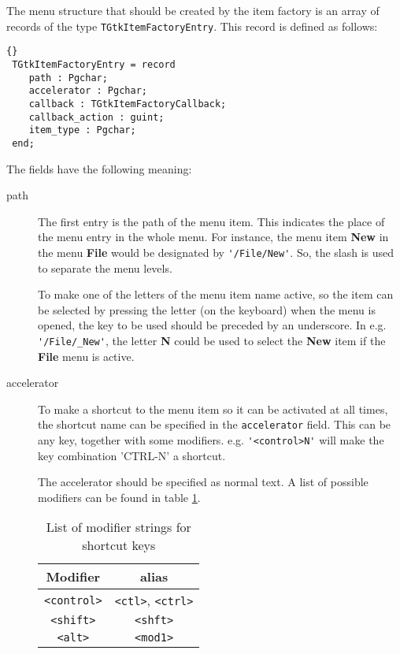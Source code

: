 \documentclass[10pt]{article}
\begin{document}
The menu structure that should be created by the item factory is an 
array of records of the type  \lstinline|TGtkItemFactoryEntry|. 
This record is defined as follows:
\begin{lstlisting}{}
 TGtkItemFactoryEntry = record
    path : Pgchar;
    accelerator : Pgchar;
    callback : TGtkItemFactoryCallback;
    callback_action : guint;
    item_type : Pgchar;
 end;
\end{lstlisting}
The fields have the following meaning:
\begin{description}
\item[path]
The first entry is the path of the menu item. This indicates the place of
the menu entry in the whole menu. For instance, the menu item \textbf{New}
in the menu \textbf{File} would be designated by \lstinline|'/File/New'|.
So, the slash is used to separate the menu levels. 

To make one of the letters of the menu item name active, so the item can be
selected by pressing the letter (on the keyboard) when the menu is opened, 
the key to be used should be preceded by an underscore. 
In e.g. \lstinline|'/File/_New'|, the letter \textbf{N} could be used to 
select the  \textbf{New} item if the \textbf{File} menu is active.

\item[accelerator] To make a shortcut to the menu item so it can be 
activated at all times, the shortcut name can be specified in the 
\lstinline|accelerator| field. This can be any key, together with some 
modifiers. e.g. \lstinline|'<control>N'| will make the key combination 
'CTRL-N' a shortcut.

The accelerator should be specified as normal text.  A list of possible
modifiers can be found in table \ref{tab:modifiers}.
\begin{table}[ht]
\begin{center}
\caption{List of modifier strings for shortcut keys}\label{tab:modifiers}
\begin{tabular}{cc}
Modifier & alias \\ \hline
\lstinline|<control>| & \lstinline|<ctl>|, \lstinline|<ctrl>| \\
\lstinline|<shift>| & \lstinline|<shft>| \\
\lstinline|<alt>| & \lstinline|<mod1>| \\ \hline
\end{tabular}
\end{center}
\end{table}


\end{description}
\end{document}
